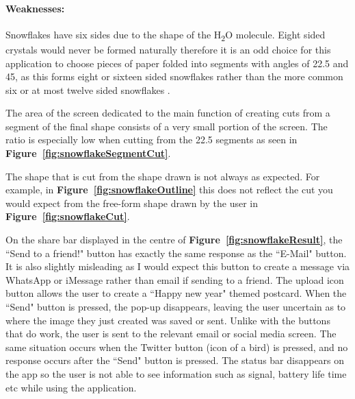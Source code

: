 \documentclass[11pt]{article}
\begin{document}
                \paragraph{Weaknesses:}
                Snowflakes have six sides due to the shape of the H\textsubscript{2}O molecule. Eight sided crystals would never be formed naturally therefore it is an odd choice for this application to choose pieces of paper folded into segments with angles of 22.5\textdegree{} and 45\textdegree{}, as this forms eight or sixteen sided snowflakes rather than the more common six or at most twelve sided snowflakes \cite{H2O}. 
                
                The area of the screen dedicated to the main function of creating cuts from a segment of the final shape consists of a very small portion of the screen. The ratio is especially low when cutting from the 22.5\textdegree{} segments as seen in \textbf{Figure~\ref{fig:snowflakeSegmentCut}}.
                
                The shape that is cut from the shape drawn is not always as expected. For example, in \textbf{Figure~\ref{fig:snowflakeOutline}} this does not reflect the cut you would expect from the free-form shape drawn by the user in \textbf{Figure~\ref{fig:snowflakeCut}}.
               
                On the share bar displayed in the centre of \textbf{Figure~\ref{fig:snowflakeResult}}, the ``Send to a friend!" button has exactly the same response as the ``E-Mail" button. It is also slightly  misleading as I would expect this button to create a message via WhatsApp or iMessage rather than email if sending to a friend. The upload icon button allows the user to create a ``Happy new year" themed postcard. When the ``Send" button is pressed, the pop-up disappears, leaving the user uncertain as to where the image they just created was saved or sent. Unlike with the buttons that do work, the user is sent to the relevant email or social media screen. The same situation occurs when the Twitter button (icon of a bird) is pressed, and no response occurs after the ``Send" button is pressed.
                The status bar disappears on the app so the user is not able to see information such as signal, battery life time etc while using the application. 
                 
\end{document}
